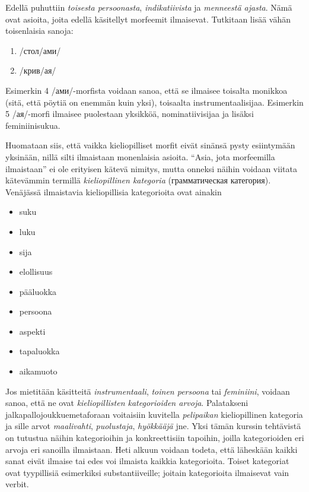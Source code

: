 \documentclass[]{scrartcl}
\providecommand{\tightlist}{%
  \setlength{\itemsep}{0pt}\setlength{\parskip}{0pt}}
\begin{document}
Edellä puhuttiin \emph{toisesta persoonasta}, \emph{indikatiivista} ja
\emph{menneestä ajasta}. Nämä ovat asioita, joita edellä käsitellyt
morfeemit ilmaisevat. Tutkitaan lisää vähän toisenlaisia sanoja:

\begin{enumerate}
\def\labelenumi{(\arabic{enumi})}
\setcounter{enumi}{3}
\tightlist
\item
  /стол/ами/
\item
  /крив/ая/
\end{enumerate}

Esimerkin 4 /ами/-morfista voidaan sanoa, että se ilmaisee toisalta
monikkoa (sitä, että pöytiä on enemmän kuin yksi), toisaalta
instrumentaalisijaa. Esimerkin 5 /ая/-morfi ilmaisee puolestaan
yksikköä, nominatiivisijaa ja lisäksi feminiinisukua.

Huomataan siis, että vaikka kieliopilliset morfit eivät sinänsä pysty
esiintymään yksinään, nillä silti ilmaistaan monenlaisia asioita.
``Asia, jota morfeemilla ilmaistaan'' ei ole erityisen kätevä nimitys,
mutta onneksi näihin voidaan viitata kätevämmin termillä
\emph{kieliopillinen kategoria} (грамматическая категория). Venäjässä
ilmaistavia kieliopillisia kategorioita ovat ainakin

\begin{itemize}
\tightlist
\item
  suku
\item
  luku
\item
  sija
\item
  elollisuus
\item
  pääluokka
\item
  persoona
\item
  aspekti
\item
  tapaluokka
\item
  aikamuoto
\end{itemize}

Jos mietitään käsitteitä \emph{instrumentaali}, \emph{toinen persoona}
tai \emph{feminiini}, voidaan sanoa, että ne ovat \emph{kieliopillisten
kategorioiden arvoja}. Palatakseni jalkapallojoukkuemetaforaan
voitaisiin kuvitella \emph{pelipaikan} kieliopillinen kategoria ja sille
arvot \emph{maalivahti}, \emph{puolustaja}, \emph{hyökkääjä} jne. Yksi
tämän kurssin tehtävistä on tutustua näihin kategorioihin ja
konkreettisiin tapoihin, joilla kategorioiden eri arvoja eri sanoilla
ilmaistaan. Heti alkuun voidaan todeta, että läheskään kaikki sanat
eivät ilmaise tai edes voi ilmaista kaikkia kategorioita. Toiset
kategoriat ovat tyypillisiä esimerkiksi substantiiveille; joitain
kategorioita ilmaisevat vain verbit.
\end{document}
